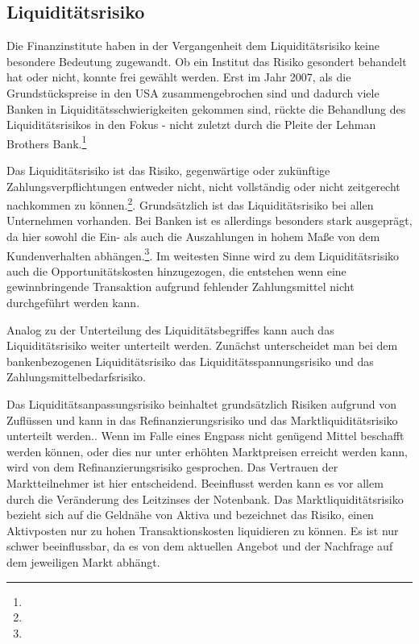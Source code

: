 \begin{onehalfspacing}
\section{Liquiditätsrisiko}
Die Finanzinstitute haben in der Vergangenheit dem Liquiditätsrisiko keine besondere Bedeutung zugewandt. Ob ein Institut das Risiko gesondert behandelt hat oder nicht, konnte frei gewählt werden. Erst im Jahr 2007, als die Grundstückspreise in den USA zusammengebrochen sind und dadurch viele Banken in Liquiditätsschwierigkeiten gekommen sind, rückte die Behandlung des Liquiditätsrisikos in den Fokus - nicht zuletzt durch die Pleite der Lehman Brothers Bank.\footnote{ }


Das Liquiditätsrisiko ist das Risiko, gegenwärtige oder zukünftige Zahlungsverpflichtungen entweder nicht, nicht vollständig oder nicht zeitgerecht nachkommen zu können.\footnote{  }. Grundsätzlich ist das Liquiditätsrisiko bei allen Unternehmen vorhanden. Bei Banken ist es allerdings besonders stark ausgeprägt, da hier sowohl die Ein- als auch die Auszahlungen in hohem Maße von dem Kundenverhalten abhängen.\footnote{ }. Im weitesten Sinne wird zu dem Liquiditätsrisiko auch die Opportunitätskosten hinzugezogen, die entstehen wenn eine gewinnbringende Transaktion aufgrund fehlender Zahlungsmittel nicht durchgeführt werden kann.

Analog zu der Unterteilung des Liquiditätsbegriffes kann auch das Liquiditätsrisiko weiter unterteilt werden. Zunächst unterscheidet man bei dem bankenbezogenen Liquiditätsrisiko das Liquiditätsspannungsrisiko und das Zahlungsmittelbedarfsrisiko.

Das Liquiditätsanpassungsrisiko beinhaltet grundsätzlich Risiken aufgrund von Zuflüssen und kann in das Refinanzierungsrisiko und das Marktliquiditätsrisiko unterteilt werden.. Wenn im Falle eines Engpass nicht genügend Mittel beschafft werden können, oder dies nur unter erhöhten Marktpreisen erreicht werden kann, wird von dem Refinanzierungsrisiko gesprochen. Das Vertrauen der Marktteilnehmer ist hier entscheidend. Beeinflusst werden kann es vor allem durch die Veränderung des Leitzinses der Notenbank. Das Marktliquiditätsrisiko bezieht sich auf die Geldnähe von Aktiva und bezeichnet das Risiko, einen Aktivposten nur zu hohen Transaktionskosten liquidieren zu können. Es ist nur schwer beeinflussbar, da es von dem aktuellen Angebot und der Nachfrage auf dem jeweiligen Markt abhängt.


\end{onehalfspacing}
